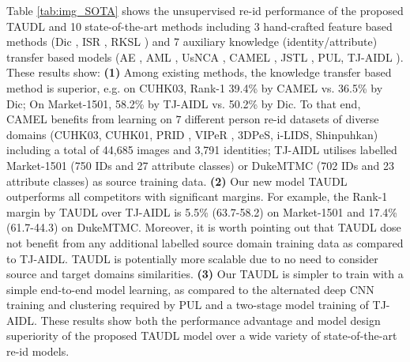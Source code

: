 \documentclass[runningheads]{llncs}
\begin{document}
Table \ref{tab:img_SOTA}
shows the unsupervised re-id performance
of the proposed TAUDL and 10 state-of-the-art methods including 
3 hand-crafted feature based methods 
(Dic \cite{kodirov2015dictionary}, ISR \cite{lisanti2015person}, RKSL \cite{wang2016towards}) and 
7 auxiliary knowledge (identity/attribute) transfer based models 
(AE \cite{lee2008sparse},
AML \cite{ye2007adaptive}, 
UsNCA \cite{qin2015unsupervised}, 
CAMEL \cite{yu2017cross},
JSTL \cite{xiao2016learning},
PUL\cite{fan2017unsupervised},
TJ-AIDL \cite{want2018Transfer}).
These results show:
{\bf(1)}
Among existing methods,
the knowledge transfer based method is superior,
e.g. on CUHK03, Rank-1 39.4\% by CAMEL vs. 36.5\% by Dic; On
Market-1501, 58.2\% by TJ-AIDL vs. 50.2\% by Dic.
To that end, CAMEL benefits from learning on $7$ different
person re-id datasets of diverse domains
(CUHK03\cite{li2014deepreid}, CUHK01\cite{li2012human}, PRID \cite{hirzer2011person}, VIPeR \cite{gray2008viewpoint}, 3DPeS\cite{baltieri20113dpes}, i-LIDS\cite{prosser2010person}, Shinpuhkan\cite{kawanishi2014shinpuhkan2014}) 
including a total of 44,685 images and 3,791 identities;
TJ-AIDL utilises labelled Market-1501 (750 IDs and 27 attribute classes) or DukeMTMC (702 IDs and 23 attribute classes) as source training data.
{\bf (2)} Our new model TAUDL outperforms all competitors with significant margins.
For example, the Rank-1 margin by TAUDL over TJ-AIDL
is 5.5\% (63.7-58.2) on Market-1501 and 17.4\% (61.7-44.3) on DukeMTMC.
Moreover, it is worth pointing out that TAUDL dose not benefit from any
additional labelled source domain training data as compared to TJ-AIDL.
TAUDL is potentially more scalable due to no need to consider source
and target domains similarities. 
{\bf (3)} 
Our TAUDL is simpler to train
with a simple end-to-end model learning, as compared to the alternated
deep CNN training and clustering required by PUL and a two-stage model
training of TJ-AIDL. 
These results show both the performance advantage and 
model design superiority of the proposed TAUDL model
over a wide variety of state-of-the-art re-id models.
\end{document}

